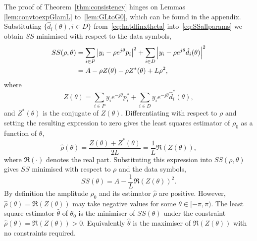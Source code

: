 \documentclass[journal]{IEEEtran}
\begin{document}
The proof of Theorem~\ref{thm:consistency} hinges on Lemmas \ref{lem:convtoexpGlamL} to~\ref{lem:GLtoG0}, which can be found in the appendix.
Substituting $\{ \hat{d}_i(\theta), i \in D \}$ from~\eqref{eq:hatdfinxtheta} into~\eqref{eq:SSallparams} we obtain $SS$ minimised with respect to the data symbols,
 \begin{align*}
SS(\rho, \theta) &=\sum_{i \in P} {\left\vert  y_i - \rho e^{j\theta} p_i  \right\vert}^2 + \sum_{i \in D} {\left\vert  y_i - \rho e^{j\theta} \hat{d_i}(\theta)  \right\vert}^2 \\
&= A - \rho Z(\theta) - \rho Z^*(\theta) + L \rho^2,
\end{align*}
where
\[
Z(\theta)  = \sum_{i \in P} y_i e^{-j\theta} p_i^* + \sum_{i \in D} y_i e^{-j\theta} \hat{d}_i^*(\theta),
\]
and $Z^*(\theta)$ is the conjugate of $Z(\theta)$.  Differentiating with respect to $\rho$ and setting the resulting expression to zero gives the least squares estimator of $\rho_0$ as a function of $\theta$,
\begin{equation}\label{eq:hatrhoZ}
\hat{\rho}(\theta) = \frac{Z(\theta) + Z^*(\theta)}{2L} = \frac{1}{L}\Re(Z(\theta)),
\end{equation}
where $\Re(\cdot)$ denotes the real part.  %
Substituting this expression into $SS(\rho, \theta)$ gives $SS$ minimised with respect to $\rho$ and the data symbols,
\[
SS(\theta) = A - \frac{1}{L}\Re(Z(\theta))^2.
\]
By definition the amplitude $\rho_0$ and its estimator $\hat{\rho}$ are positive.  However, $\hat{\rho}(\theta) = \Re(Z(\theta))$ may take negative values for some $\theta \in [-\pi,\pi)$.  %
The least square estimator $\hat{\theta}$ of $\theta_0$ is the minimiser of $SS(\theta)$ under the constraint $\hat{\rho}(\theta) = \Re(Z(\theta)) > 0$.  Equivalently $\hat{\theta}$ is the maximiser of $\Re(Z(\theta))$ with no constraints required.
 
\end{document}
